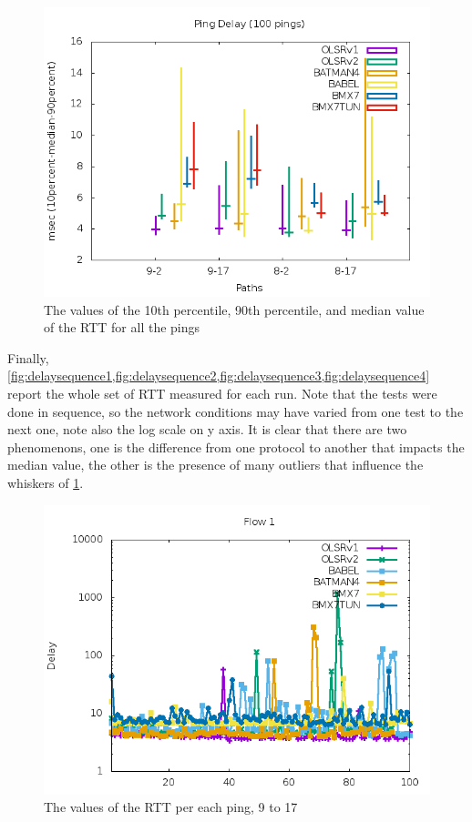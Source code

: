 \documentclass[10pt,onecolumn]{paper}
\begin{document}
\begin{figure}[!htb]
  \centering
  \includegraphics[width=.9\linewidth]{images/failure_test_delay-IPv6.png}
  \caption{The values of the 10th percentile, 90th percentile, and median value
    of the RTT for all the pings}
  \label{fig:delaydist}
\end{figure}


Finally,
\cref{fig:delaysequence1,fig:delaysequence2,fig:delaysequence3,fig:delaysequence4}
report the whole set of RTT measured for each run. Note that the tests were done
in sequence, so the network conditions may have varied from one test to the next
one, note also the log scale on y axis. It is clear that there are two
phenomenons, one is the difference from one protocol to another that impacts the
median value, the other is the presence of many outliers that influence the
whiskers of \cref{fig:delaydist}.

\begin{figure}[!htb]
  \centering
  \includegraphics[width=.9\linewidth]{images/failure_test_delay_distribution-IPv6-1-timesequence.png}
    \caption{The values of the RTT per each ping, 9 to 17}
  \label{fig:delaysequence1}
\end{figure}
\end{document}
